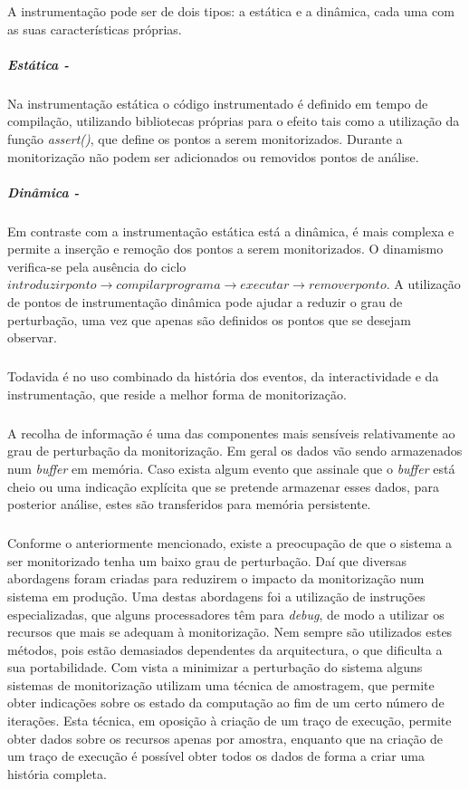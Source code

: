 \begin{itemize}
A instrumentação pode ser de dois tipos: a estática e a dinâmica, cada uma com as suas características próprias.

\subparagraph*{Estática - }

Na instrumentação estática o código instrumentado é definido em tempo de compilação, utilizando bibliotecas próprias para o efeito tais como a utilização da função \textit{assert()}, que define os pontos a serem monitorizados.
Durante a monitorização não podem ser adicionados ou removidos pontos de análise.

\subparagraph*{Dinâmica - }

Em contraste com a instrumentação estática está a dinâmica, é mais complexa e permite a inserção e remoção dos pontos a serem monitorizados.
O dinamismo verifica-se pela ausência do ciclo $introduzir ponto\rightarrow compilar programa\rightarrow executar\rightarrow remover ponto$.
A utilização de pontos de instrumentação dinâmica pode ajudar a reduzir o grau de perturbação, uma vez que apenas são definidos os pontos que se desejam observar.
\end{itemize}

\subparagraph*{}
Todavida é no uso combinado da história dos eventos, da interactividade e da instrumentação, que reside a melhor forma de monitorização.

\subparagraph*{
}
A recolha de informação é uma das componentes mais sensíveis relativamente ao grau de perturbação da monitorização.
Em geral os dados vão sendo armazenados num \textit{buffer} em memória.
Caso exista algum evento que assinale que o \textit{buffer} está cheio ou uma indicação explícita que se pretende armazenar esses dados, para posterior análise, estes são transferidos para memória persistente.

\subparagraph*{
}
Conforme o anteriormente mencionado, existe a preocupação de que o sistema a ser monitorizado tenha um baixo grau de perturbação.
Daí que diversas abordagens foram criadas para reduzirem o impacto da monitorização num sistema em produção.
Uma destas abordagens foi a utilização de instruções especializadas, que alguns processadores têm para \textit{debug}, de modo a utilizar os recursos que mais se adequam à monitorização.
Nem sempre são utilizados estes métodos, pois estão demasiados dependentes da arquitectura, o que dificulta a sua portabilidade.
Com vista a minimizar a perturbação do sistema alguns sistemas de monitorização utilizam uma técnica de amostragem, que permite obter indicações sobre os estado da computação ao fim de um certo número de iterações.
Esta técnica, em oposição à criação de um traço de execução, permite obter dados sobre os recursos apenas por amostra, enquanto que na criação de um traço de execução é possível obter todos os dados de forma a criar uma história completa.

